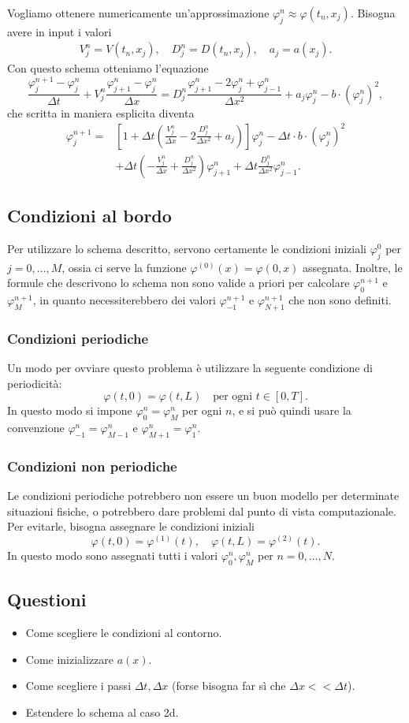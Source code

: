 \documentclass [11pt]{article}
\renewcommand{\phi}{\varphi}
\newcommand{\tonde}[1]{\left( #1 \right)}
\newcommand{\quadre}[1]{\left[ #1 \right]}
\theoremstyle{definition}
\theoremstyle{definition}
\newcommand{ \ssss }[1]{\subsubsection*{#1}}
\newcommand{ \sss }[1]{\subsection*{#1}}
\begin{document}
Vogliamo ottenere numericamente un'approssimazione $\phi^n_j\approx \phi(t_n,x_j)$. Bisogna avere in input i valori
%
\begin{align*}
	V_j^n=V(t_n,x_j),\quad D_j^n=D(t_n,x_j),\quad a_j=a(x_j).
\end{align*}
%
Con questo schema otteniamo l'equazione
%
$$
\frac{\phi^{n+1}_j-\phi^n_j }{\Delta t}+V_j^n\frac{\phi^n_{j+1}-\phi^n_j }{\Delta x}=
D^n_j\frac{\phi^n_{j+1}-2\phi^n_j+\phi^n_{j-1}}{\Delta x^2}+a_j\phi^n_j-b\cdot (\phi^n_j)^2,
$$
%
che scritta in maniera esplicita diventa
%
\begin{align*}
\phi^{n+1}_j=&\quadre{ 1+\Delta t\tonde{ \frac{V_j^n}{\Delta x}-2\frac{D_j^n}{\Delta x^2}+a_j } }\phi^n_j-\Delta t\cdot b\cdot (\phi^n_j)^2\\
&+\Delta t\tonde{ -\frac{V_j^n}{\Delta x}+\frac{D_j^n}{\Delta x^2} }\phi_{j+1}^n+\Delta t\frac{D_j^n}{\Delta x^2}\phi^n_{j-1}.
\end{align*}



\sss{Condizioni al bordo}



Per utilizzare lo schema descritto, servono certamente le condizioni iniziali $\phi_j^0$ per $j=0,\dots, M$, ossia ci serve la funzione $\phi^{(0)}(x)=\phi(0,x)$ assegnata. Inoltre, le formule che descrivono lo schema non sono valide a priori per calcolare $\phi^{n+1}_0$ e $\phi^{n+1}_{M}$, in quanto necessiterebbero dei valori $\phi^{n+1}_{-1}$ e $\phi^{n+1}_{N+1}$ che non sono definiti.

\ssss{Condizioni periodiche }

Un modo per ovviare questo problema è utilizzare la seguente condizione di periodicità:
%
$$
\phi(t,0)=\phi(t,L)\quad \text{per ogni $t\in[0,T]$}.
$$
%
In questo modo si impone $\phi_0^n=\phi_M^n$ per ogni $n$, e si può quindi usare la convenzione $\phi^n_{-1}=\phi^n_{M-1}$ e $\phi^n_{M+1}=\phi^n_1$.


\ssss{Condizioni non periodiche}
Le condizioni periodiche potrebbero non essere un buon modello per determinate situazioni fisiche, o potrebbero dare problemi dal punto di vista computazionale. Per evitarle, bisogna assegnare le condizioni iniziali
%
$$
\phi(t,0)=\phi^{(1)}(t),\quad \phi(t,L)=\phi^{(2)}(t).
$$
In questo modo sono assegnati tutti i valori $\phi^n_0, \phi^n_M$ per $n=0,\dots,N$.
%



\sss{Questioni}


\begin{itemize}
	\item Come scegliere le condizioni al contorno.
	\item Come inizializzare $a(x)$.
	\item Come scegliere i passi $\Delta t, \Delta x$ (forse bisogna far sì che $\Delta x<<\Delta t$).
	\item Estendere lo schema al caso 2d.
\end{itemize}





		
\end{document}
